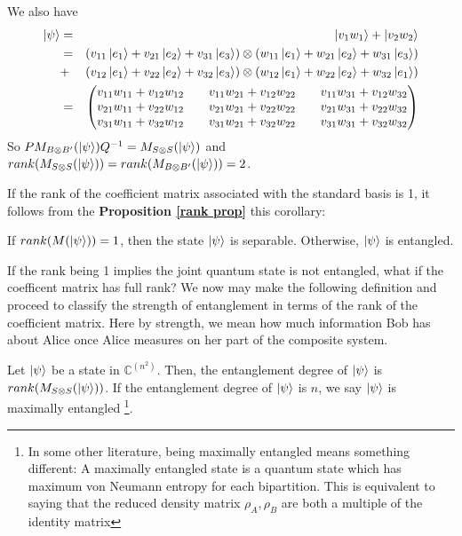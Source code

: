 \begin{example}

We also have
\begin{eqnarray*}
\ket{\psi}&=&\ket{v_1 w_1}+\ket{v_2 w_2}\\
&=& (v_{11}\ket{e_1}+v_{21}\ket{e_2}+v_{31}\ket{e_3}) \otimes (w_{11}\ket{e_1}+w_{21}\ket{e_2}+w_{31}\ket{e_3}) \\
&+& (v_{12}\ket{e_1}+v_{22}\ket{e_2}+v_{32}\ket{e_3}) \otimes (w_{12}\ket{e_1}+w_{22}\ket{e_2}+w_{32}\ket{e_1})\\
&=&\begin{pmatrix}
v_{11}w_{11}+v_{12}w_{12} && v_{11}w_{21}+v_{12}w_{22} && v_{11}w_{31}+v_{12}w_{32}\\
v_{21}w_{11}+v_{22}w_{12} && v_{21}w_{21}+v_{22}w_{22} && v_{21}w_{31}+v_{22}w_{32} \\
v_{31}w_{11}+v_{32}w_{12} && v_{31}w_{21}+v_{32}w_{22} && v_{31}w_{31}+v_{32}w_{32} 
\end{pmatrix}
\end{eqnarray*}
So $PM_{B \otimes B'}(\ket{\psi})Q^{-1}=M_{S \otimes S}(\ket{\psi})$ and $rank(M_{S \otimes S}(\ket{\psi}))=rank(M_{B \otimes B'}(\ket{\psi}))=2$.
\end{example}

\bigskip
If the rank of the coefficient matrix associated with the standard basis is 1, it follows from the \textbf{Proposition \ref{rank prop}} this corollary:

\begin{corollary}
If $rank(M(\ket{\psi}))=1$, then the state $\ket{\psi}$ is separable. Otherwise, $\ket{\psi}$ is entangled.
\end{corollary}

If the rank being 1 implies the joint quantum state is not entangled, what if the coefficent matrix has full rank? We now may make the following definition and proceed to classify the strength of entanglement in terms of the rank of the coefficient matrix. Here by strength, we mean how much information Bob has about Alice once Alice measures on her part of the composite system.

\begin{definition} \label{def: maximally entangled}
 Let $\ket{\psi}$ be a state in ${\mathbb{C}}^{(n^2)}$.  Then, the entanglement degree of $\ket{\psi}$ is $rank(M_{S \otimes S}(\ket{\psi}))$.  If the entanglement degree of $\ket{\psi}$ is $n$, we say $\ket{\psi}$ is maximally entangled \footnote{In some other literature, being maximally entangled means something different: A maximally entangled state is a quantum state which has maximum von Neumann entropy for each bipartition. This is equivalent to saying that the reduced density matrix $\rho_A, \rho_B$ are both a multiple of the identity matrix}.
\end{definition}

